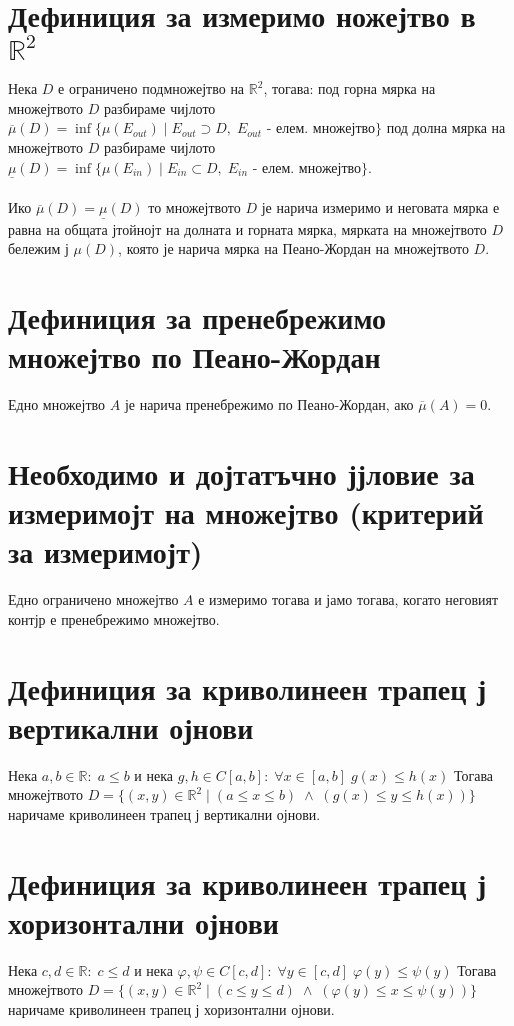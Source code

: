 \documentclass[14pt]{extarticle}
\newcommand{\R}{\mathbb{R}}
\begin{document}
\section*{Дефиниция за измеримо ножејтво в \(\R^2\)}
Нека \(D\) е ограничено подмножејтво на \(\R^2\), тогава:
под горна мярка на множејтвото \(D\) разбираме чијлото \(\overline{\mu}(D) = \inf\{\mu(E_{out}) \; | \; E_{out} \supset D, \; E_{out} \text{ - елем. множејтво} \}\)
под долна мярка на множејтвото \(D\) разбираме чијлото \\
\(\underline{\mu}(D) = \inf\{\mu(E_{in}) \; | \; E_{in} \subset D, \; E_{in} \text{ - елем. множејтво} \}\). \\\\
Ико \(\overline{\mu}(D) = \underline{\mu}(D)\) то множејтвото \(D\) је нарича измеримо и неговата мярка е равна на общата јтойнојт на долната и горната мярка,
мярката на множејтвото \(D\) бележим ј \(\mu(D)\), която је нарича мярка на Пеано-Жордан на множејтвото \(D\).
\section*{Дефиниция за пренебрежимо множејтво по Пеано-Жордан}
Едно множејтво \(A\) је нарича пренебрежимо по Пеано-Жордан, ако \(\overline{\mu}(A) = 0\).
\section*{Необходимо и дојтатъчно јјловие за измеримојт на множејтво (критерий за измеримојт)}
Едно ограничено множејтво \(A\) е измеримо тогава и јамо тогава, когато неговият контјр е пренебрежимо множејтво.
\section*{Дефиниция за криволинеен трапец ј вертикални ојнови}
Нека \(a, b \in \R : \; a \leq b \) и нека \(g, h \in C[a, b] : \; \forall x \in [a, b] \; g(x) \leq h(x)\)
Тогава множејтвото \(D = \{(x, y) \in \R^2 \; | \; (a \leq x \leq b) \; \land \; (g(x) \leq y \leq h(x)) \}\) наричаме криволинеен трапец ј вертикални ојнови.
\section*{Дефиниция за криволинеен трапец ј хоризонтални ојнови}
Нека \(c, d \in \R : \; c \leq d \) и нека \(\varphi, \psi \in C[c, d] : \; \forall y \in [c, d] \; \varphi(y) \leq \psi(y)\)
Тогава множејтвото \(D = \{(x, y) \in \R^2 \; | \; (c \leq y \leq d) \; \land \; (\varphi(y) \leq x \leq \psi(y)) \}\) наричаме криволинеен трапец ј хоризонтални ојнови.
\end{document}
